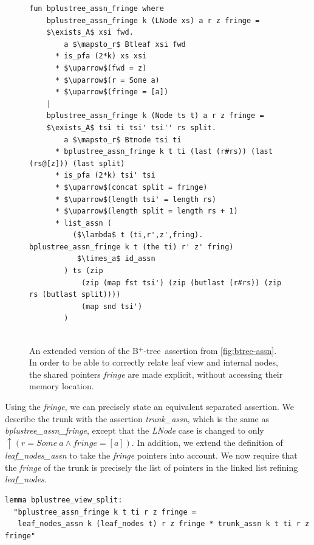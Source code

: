 \documentclass[a4paper,UKenglish,cleveref, cref, thm-restate]{lipics-v2021}
\newcommand{\btree}{B$^+$-tree}
\begin{document}
\begin{figure}
    \centering
\begin{lstlisting}[mathescape=true, language=Isabelle,label=lst:btree-assn-leaves]
fun bplustree_assn_fringe where
    bplustree_assn_fringe k (LNode xs) a r z fringe =
    $\exists_A$ xsi fwd.
        a $\mapsto_r$ Btleaf xsi fwd
      * is_pfa (2*k) xs xsi
      * $\uparrow$(fwd = z)
      * $\uparrow$(r = Some a)
      * $\uparrow$(fringe = [a])
    |
    bplustree_assn_fringe k (Node ts t) a r z fringe =
    $\exists_A$ tsi ti tsi' tsi'' rs split.
        a $\mapsto_r$ Btnode tsi ti
      * bplustree_assn_fringe k t ti (last (r#rs)) (last (rs@[z])) (last split)
      * is_pfa (2*k) tsi' tsi
      * $\uparrow$(concat split = fringe)
      * $\uparrow$(length tsi' = length rs)
      * $\uparrow$(length split = length rs + 1)
      * list_assn (
          ($\lambda$ t (ti,r',z',fring). bplustree_assn_fringe k t (the ti) r' z' fring)
           $\times_a$ id_assn
        ) ts (zip 
            (zip (map fst tsi') (zip (butlast (r#rs)) (zip rs (butlast split))))
            (map snd tsi')
        )
       
\end{lstlisting}
    \caption[\btree\ assertion with extracted fringe]{
        An extended version of the \btree\ assertion from \cref{fig:btree-assn}.
        In order to be able to correctly relate leaf view and internal nodes,
        the shared pointers \emph{fringe} are made explicit, without accessing their memory location.
    }
    \label{fig:btree-assn-leaves}
\end{figure}


Using the \emph{fringe}, we can precisely state an equivalent separated assertion.
We describe the trunk with the assertion \emph{trunk\_assn},
which is the same as \emph{bplustree\_assn\_fringe},
except that the \emph{LNode} case is changed to only $\uparrow(r = \mathit{Some}\ a \wedge \mathit{fringe} = [a])$.
In addition, we extend the definition of \emph{leaf\_nodes\_assn}
to take the \emph{fringe} pointers into account.
We now require that the \emph{fringe} of the trunk is
precisely the list of pointers in the linked list refining \emph{leaf\_nodes}.

\begin{lstlisting}[mathescape=true, language=Isabelle,label=lst:btree-view-split]
lemma bplustree_view_split:
  "bplustree_assn_fringe k t ti r z fringe =
   leaf_nodes_assn k (leaf_nodes t) r z fringe * trunk_assn k t ti r z fringe"
\end{lstlisting}
\end{document}
